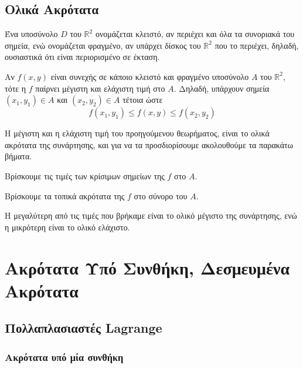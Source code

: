 \section{Ολικά Ακρότατα}

Ένα υποσύνολο $D$ του $ \mathbb{R}^{2} $ ονομάζεται κλειστό, αν περιέχει και όλα 
τα συνοριακά του σημεία, ενώ ονομάζεται φραγμένο, αν υπάρχει δίσκος του 
$ \mathbb{R}^{2} $ που το περιέχει, δηλαδή, ουσιαστικά ότι είναι περιορισμένο σε έκταση.

\begin{thm}
  Αν $f(x,y)$ είναι συνεχής σε κάποιο κλειστό και φραγμένο υποσύνολο $A$ του $
  \mathbb{R}^{2} $, τότε η $f$ παίρνει μέγιστη και ελάχιστη τιμή στο $A$. Δηλαδή, 
  υπάρχουν σημεία $ (x_{1}, y_{1}) \in A $ και $ (x_{2}, y_{2}) \in A $ τέτοια ώστε 
  \[
    f(x_{1}, y_{1}) \leq f(x,y) \leq f(x_{2}, y_{2})
  \]
\end{thm}

Η μέγιστη και η ελάχιστη τιμή του προηγούμενου θεωρήματος, είναι το ολικά ακρότατα 
της συνάρτησης, και για να τα προσδιορίσουμε ακολουθούμε τα παρακάτω βήματα.

\begin{myitemize}
  \item Βρίσκουμε τις τιμές των κρίσιμων σημείων της $f$ στο $A$.
  \item Βρίσκουμε τα τοπικά ακρότατα της $f$ στο σύνορο του $A$. 
  \item Η μεγαλύτερη από τις τιμές που βρήκαμε είναι το ολικό μέγιστο της 
    συνάρτησης, ενώ η μικρότερη είναι το ολικό ελάχιστο.
\end{myitemize}




\chapter{Ακρότατα Υπό Συνθήκη, Δεσμευμένα Ακρότατα}

\section{Πολλαπλασιαστές Lagrange}

\subsection{Ακρότατα υπό μία συνθήκη}

